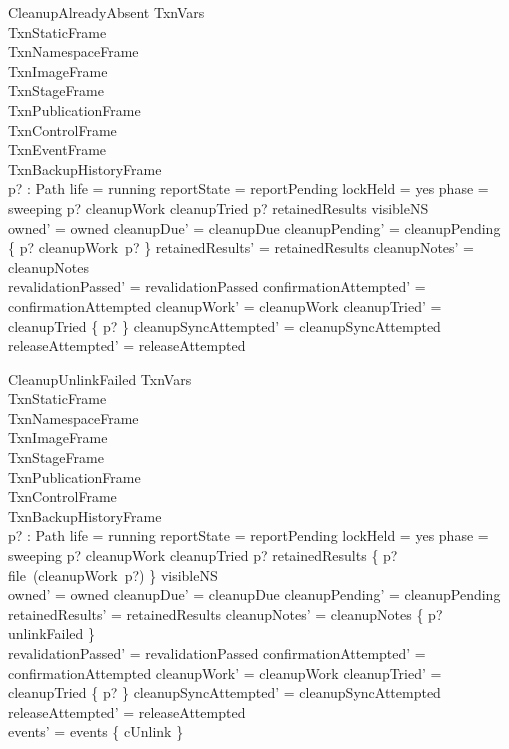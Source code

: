 \documentclass{article}
\begin{document}
\begin{schema}{CleanupAlreadyAbsent}
	\Delta TxnVars \\
	TxnStaticFrame \\
	TxnNamespaceFrame \\
	TxnImageFrame \\
	TxnStageFrame \\
	TxnPublicationFrame \\
	TxnControlFrame \\
	TxnEventFrame \\
	TxnBackupHistoryFrame \\
	p? : Path
	\where
	life = running \land reportState = reportPending \land lockHeld = yes \land
	phase = sweeping \land p? \in \dom cleanupWork \setminus cleanupTried \land
	p? \notin \dom retainedResults \cup \dom visibleNS \\
	owned' = owned \land cleanupDue' = cleanupDue \land
	cleanupPending' = cleanupPending \oplus \{ p? \mapsto cleanupWork~p? \} \land
	retainedResults' = retainedResults \land cleanupNotes' = cleanupNotes \\
	revalidationPassed' = revalidationPassed \land
	confirmationAttempted' = confirmationAttempted \land
	cleanupWork' = cleanupWork \land cleanupTried' = cleanupTried \cup \{ p? \} \land
	cleanupSyncAttempted' = cleanupSyncAttempted \land releaseAttempted' = releaseAttempted
\end{schema}

\begin{schema}{CleanupUnlinkFailed}
	\Delta TxnVars \\
	TxnStaticFrame \\
	TxnNamespaceFrame \\
	TxnImageFrame \\
	TxnStageFrame \\
	TxnPublicationFrame \\
	TxnControlFrame \\
	TxnBackupHistoryFrame \\
	p? : Path
	\where
	life = running \land reportState = reportPending \land lockHeld = yes \land
	phase = sweeping \land p? \in \dom cleanupWork \setminus cleanupTried \land
	p? \notin \dom retainedResults \land
	\{ p? \mapsto file~(cleanupWork~p?) \} \subseteq visibleNS \\
	owned' = owned \land cleanupDue' = cleanupDue \land
	cleanupPending' = cleanupPending \land retainedResults' = retainedResults \land
	cleanupNotes' = cleanupNotes \oplus \{ p? \mapsto unlinkFailed \} \\
	revalidationPassed' = revalidationPassed \land
	confirmationAttempted' = confirmationAttempted \land
	cleanupWork' = cleanupWork \land cleanupTried' = cleanupTried \cup \{ p? \} \land
	cleanupSyncAttempted' = cleanupSyncAttempted \land releaseAttempted' = releaseAttempted \\
	events' = events \cup \{ cUnlink \}
\end{schema}
\end{document}
